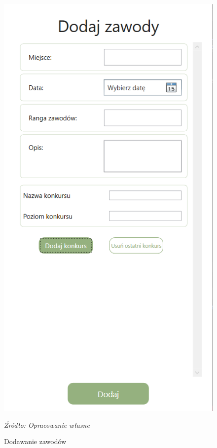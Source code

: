 \documentclass[12pt,oneside]{report}
\begin{document}
\begin{figure} [H]
	\begin{center}
		\begin{minipage}{6cm}
			\centering
			\includegraphics[scale=0.7]{dodajZawody}
			\caption{Dodawanie \newline \centering zawodów}
			\textit{Źródło: Opracowanie własne}
			\label{dodajZawody}
		\end{minipage}

\end{center}
\end{figure}
\end{document}
